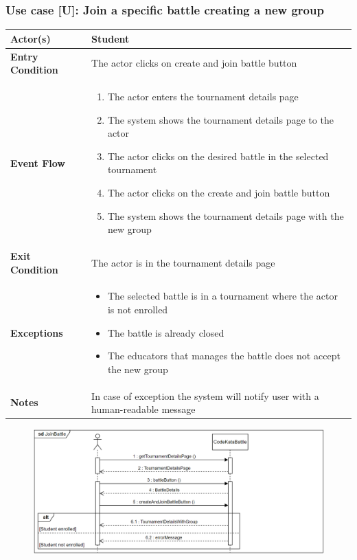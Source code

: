 \documentclass[12pt, a4paper]{report}
\newcounter{useCase}
\newcommand{\usecase}[9]{
    \def\arraystretch{1.5} 
    \subsubsection*{Use case [U#2]: #3}
    \vspace*{0.2cm}
    \begin{center}
        \begin{tabular}{|l|p{12cm}|}
            \hline
            \textbf{Actor(s)} & #4 \\
            \hline
            \textbf{Entry Condition} & #5 \\
            \hline
            \textbf{Event Flow} & #6 \\
            \hline
            \textbf{Exit Condition} & #7 \\
            \hline
            \textbf{Exceptions} & #8 \\
            \hline
            \textbf{Notes} & #9 \\
            \hline
        \end{tabular}
    \end{center}
    #1
}
\begin{document}
        \usecase{\begin{figure}[H]\centering\includegraphics[width=0.9\linewidth]{images/joinbattle.png}\end{figure}}        
        {\arabic{useCase}\stepcounter{useCase}}
        {Join a specific battle creating a new group}
        {Student}
        {The actor clicks on create and join battle button}
        {
        \begin{enumerate}
            \item The actor enters the tournament details page
            \item The system shows the tournament details page to the actor
            \item The actor clicks on the desired battle in the selected tournament
            \item The actor clicks on the create and join battle button
            \item The system shows the tournament details page with the new group
        \end{enumerate}
        }
        {The actor is in the tournament details page}
        {
        \begin{itemize}
            \item The selected battle is in a tournament where the actor is not enrolled
            \item The battle is already closed
            \item The educators that manages the battle does not accept the new group
        \end{itemize}
        }
        {In case of exception the system will notify user with a human-readable message}
\end{document}

